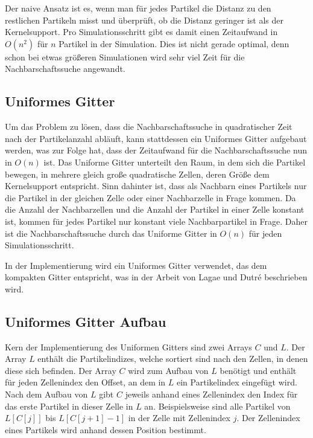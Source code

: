 \documentclass{scrreprt}
\begin{document}
Der naive Ansatz ist es, wenn man für jedes Partikel die Distanz zu den restlichen Partikeln misst und überprüft, ob die Distanz geringer ist als der Kernelsupport.
Pro Simulationsschritt gibt es damit einen Zeitaufwand in $O(n^2)$ für $n$ Partikel in der Simulation.
Dies ist nicht gerade optimal, denn schon bei etwas größeren Simulationen wird sehr viel Zeit für die Nachbarschaftssuche angewandt.


\subsection{Uniformes Gitter}
Um das Problem zu lösen, dass die Nachbarschaftssuche in quadratischer Zeit nach der Partikelanzahl abläuft,
kann stattdessen ein Uniformes Gitter aufgebaut werden, was zur Folge hat, dass der Zeitaufwand für die Nachbarschaftssuche nun in $O(n)$ ist.
Das Uniforme Gitter unterteilt den Raum, in dem sich die Partikel bewegen, in mehrere gleich große quadratische Zellen,
deren Größe dem Kernelsupport entspricht.
Sinn dahinter ist, dass als Nachbarn eines Partikels nur die Partikel in der gleichen Zelle oder einer Nachbarzelle in Frage kommen.
Da die Anzahl der Nachbarzellen und die Anzahl der Partikel in einer Zelle konstant ist,
kommen für jedes Partikel nur konstant viele Nachbarpartikel in Frage.
Daher ist die Nachbarschaftssuche durch das Uniforme Gitter in $O(n)$ für jeden Simulationsschritt.

In der Implementierung wird ein Uniformes Gitter verwendet, das dem kompakten Gitter entspricht,
was in der Arbeit von Lagae und Dutré \cite{lagae_compact_2008} beschrieben wird.

\subsection{Uniformes Gitter Aufbau}
Kern der Implementierung des Uniformen Gitters sind zwei Arrays $C$ und $L$.
Der Array $L$ enthält die Partikelindizes, welche sortiert sind nach den Zellen, in denen diese sich befinden.
Der Array $C$ wird zum Aufbau von $L$ benötigt und enthält für jeden Zellenindex den Offset, an dem in $L$ ein Partikelindex eingefügt wird.
Nach dem Aufbau von $L$ gibt $C$ jeweils anhand eines Zellenindex den Index für das erste Partikel in dieser Zelle in $L$ an.
Beispielsweise sind alle Partikel von $L[C[j]]$ bis $L[C[j+1] - 1]$ in der Zelle mit Zellenindex $j$.
Der Zellenindex eines Partikels wird anhand dessen Position bestimmt.


%
\end{document}
